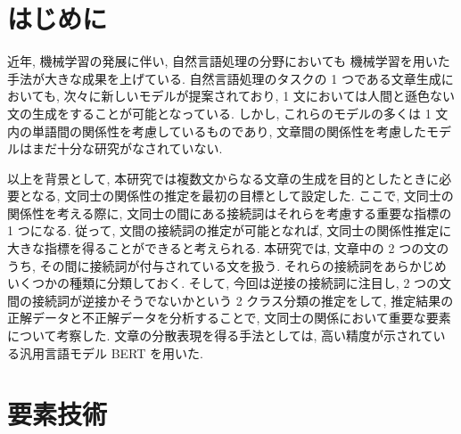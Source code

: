 \documentclass[twocolumn]{jarticle}     %
\begin{document}

\section{はじめに}
近年, 機械学習の発展に伴い, 自然言語処理の分野においても
機械学習を用いた手法が大きな成果を上げている.
自然言語処理のタスクの 1 つである文章生成においても, 次々に新しいモデルが提案されており,
1 文においては人間と遜色ない文の生成をすることが可能となっている.
しかし, これらのモデルの多くは 1 文内の単語間の関係性を考慮しているものであり,
文章間の関係性を考慮したモデルはまだ十分な研究がなされていない. \par
以上を背景として, 本研究では複数文からなる文章の生成を目的としたときに必要となる, 文同士の関係性の推定を最初の目標として設定した.
ここで, 文同士の関係性を考える際に, 文同士の間にある接続詞はそれらを考慮する重要な指標の 1 つになる. 従って,
文間の接続詞の推定が可能となれば, 文同士の関係性推定に大きな指標を得ることができると考えられる.
本研究では, 文章中の 2 つの文のうち, その間に接続詞が付与されている文を扱う.
それらの接続詞をあらかじめいくつかの種類に分類しておく.
そして, 今回は逆接の接続詞に注目し, 2 つの文間の接続詞が逆接かそうでないかという 2 クラス分類の推定をして,
推定結果の正解データと不正解データを分析することで, 文同士の関係において重要な要素について考察した.
文章の分散表現を得る手法としては, 高い精度が示されている汎用言語モデル BERT を用いた.
\section{要素技術}
\end{document}
